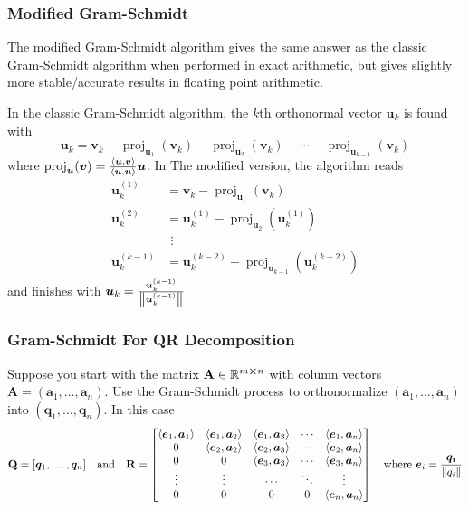 \documentclass[11pt, a4paper]{article}
\newcommand{\R}{\mathbb{R}} %
\newcommand{\mat}[1]{\mathbf{#1}} %
\begin{document}
\subsubsection{Modified Gram-Schmidt}
The modified Gram-Schmidt algorithm gives the same answer as the classic Gram-Schmidt algorithm when performed in exact arithmetic, but gives slightly more stable/accurate results in floating point arithmetic.

In the classic Gram-Schmidt algorithm, the $ k $th orthonormal vector $ \bm{u}_{k} $ is found with
\begin{equation*}
	\bm{u}_{k} = \bm{v}_{k} - \operatorname{proj}_{\bm{u}_{1}}(\bm{v}_{k}) -  \operatorname{proj}_{\bm{u}_{2}}(\bm{v}_{k}) - \cdots - \operatorname{proj}_{\bm{u}_{k-1}}(\bm{v}_{k})
\end{equation*}
where $ \operatorname{proj}_{\bm{u}}(\bm{v}) = \frac{\expval{\bm{u}, \bm{v}}}{\expval{\bm{u}, \bm{u}}}\bm{u}$. In The modified version, the algorithm reads
\begin{align*}
	\bm{u}_{k}^{(1)} &= \bm{v}_{k} - \operatorname{proj}_{\bm{u}_{1}}(\bm{v}_{k})\\
	\bm{u}_{k}^{(2)} &= \bm{u}_{k}^{(1)} - \operatorname{proj}_{\bm{u}_{2}}(\bm{u}_{k}^{(1)})\\[-3mm]
	&\ \, \vdots\\[-3mm]
	\bm{u}_{k}^{(k-1)} &= \bm{u}_{k}^{(k-2)} - \operatorname{proj}_{\bm{u}_{k-1}}(\bm{u}_{k}^{(k-2)})
\end{align*}
and finishes with $ \bm{u}_{k} = \frac{\bm{u}_{k}^{(k-1)}}{\norm{\bm{u}_{k}^{(k-1)}}}$

\subsubsection{Gram-Schmidt For QR Decomposition}
Suppose you start with the matrix $ \mat{A} \in \R^{m \cross n} $ with column vectors $ \bm{A} = (\bm{a}_{1}, \ldots, \bm{a}_{n}) $. Use the Gram-Schmidt process to orthonormalize  $ (\bm{a}_{1}, \ldots, \bm{a}_{n})  $ into $ (\bm{q}_{1}, \ldots, \bm{q}_{n})  $. In this case
\[
	\mat{Q} = [\bm{q}_{1}, \ldots, \bm{q}_{n}] \quad \text{and} \quad 
	\mat{R} = 
	\begin{bmatrix}
		 \expval{\bm{e}_{1},\bm{a}_{1}} & \expval{\bm{e}_{1},\bm{a}_{2}} & \expval{\bm{e}_{1},\bm{a}_{3}} &\cdots & \expval{\bm{e}_{1},\bm{a}_{n}} \\0
		&\expval{\bm{e}_{2},\bm{a}_{2}} & \expval{\bm{e}_{2},\bm{a}_{3}} &\cdots & \expval{\bm{e}_{2},\bm{a}_{n}}\\
		0 & 0 & \expval{\bm{e}_{3},\bm{a}_{3}} & \cdots & \expval{\bm{e}_{3},\bm{a}_{n}}\\
		\vdots &\vdots &\cdots &\ddots & \vdots \\
		0 & 0 & 0 & 0 & \expval{\bm{e}_{n},\bm{a}_{n}}
		\end{bmatrix} 
	\quad \text{where} \  \bm{e}_{i} = \frac{\bm{q_{i}}}{\norm{q_{i}}} 
\]
\end{document}
